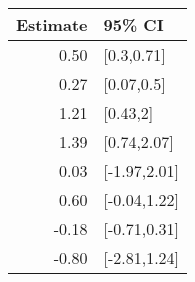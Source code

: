 \begin{tabular}{rl}
  \hline
Estimate & 95\% CI \\ 
  \hline
0.50 & [0.3,0.71] \\ 
  0.27 & [0.07,0.5] \\ 
  1.21 & [0.43,2] \\ 
  1.39 & [0.74,2.07] \\ 
  0.03 & [-1.97,2.01] \\ 
  0.60 & [-0.04,1.22] \\ 
  -0.18 & [-0.71,0.31] \\ 
  -0.80 & [-2.81,1.24] \\ 
   \hline
\end{tabular}


